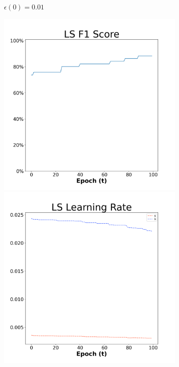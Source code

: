 \begin{figure}[H]
\begin{subfigure}{0.3\textwidth}
  \caption{$\epsilon(0)=0.01$}
\end{subfigure}\hfil %
\begin{subfigure}{0.3\textwidth}
  \includegraphics[width=\linewidth]{images/exper2/Ionosphere/LS_0.03_f1.png}
  \includegraphics[width=\linewidth]{images/exper2/Ionosphere/LS_0.03_lr.png}

\end{subfigure}
\end{figure}
